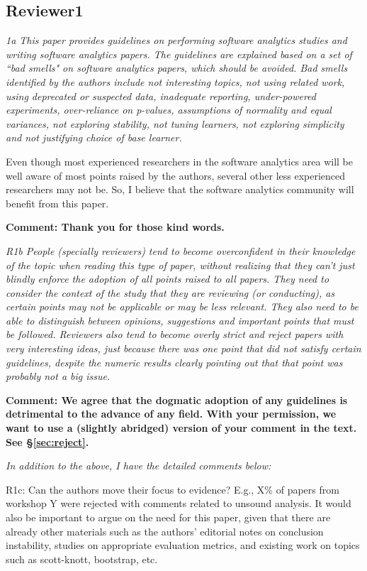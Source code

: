 \documentclass[preprint,10pt]{elsarticle}
\begin{document}
\subsection*{Reviewer1}

{\em 1a This paper provides guidelines on performing software analytics studies and writing software analytics papers. The guidelines are explained based on a set of ``bad smells" on software analytics papers, which should be avoided. Bad smells identified by the authors include not interesting topics, not using related work, using deprecated or suspected data, inadequate reporting, under-powered experiments, over-reliance on p-values, assumptions of normality and equal variances, not exploring stability, not tuning learners, not exploring simplicity and not justifying choice of base learner.

Even though most experienced researchers in the software analytics area will be well aware of most points raised by the authors, several other less experienced researchers may not be. So, I believe that the software analytics community will benefit from this paper. }

{\bf Comment: Thank you for those kind words.}

{\em 
R1b People (specially reviewers) tend to become overconfident in their knowledge of the topic when reading this type of paper, without realizing that they can't just blindly enforce the adoption of all points raised to all papers. They need to consider the context of the study that they are reviewing (or conducting), as certain points may not be applicable or may be less relevant. They also need to be able to distinguish between opinions, suggestions and important points that must be followed. Reviewers also tend to become overly strict and reject papers with very interesting ideas, just because there was one point that did not satisfy certain guidelines, despite the numeric results clearly pointing out that that point was probably not a big issue.}

{\bf Comment: We agree that the dogmatic adoption of any guidelines is detrimental to the advance of any field.
With your permission, we want to use a (slightly abridged) version of your comment in the text.
See \S\vref{sec:reject}.}

{\em In addition to the above, I have the detailed comments below:

R1c:  Can the authors move their focus to evidence? E.g., X\% of papers from workshop Y were rejected with comments related to unsound analysis. It would also be important to argue on the need for this paper, given that there are already other materials such as the authors' editorial notes on conclusion instability, studies on appropriate evaluation metrics, and existing work on topics such as scott-knott, bootstrap, etc.}
\end{document}
